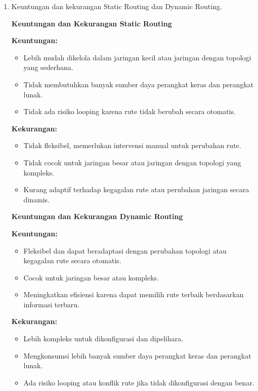 \begin{enumerate}
    \item Keuntungan dan kekurangan Static Routing dan Dynamic Routing.
    
    \textbf{Keuntungan dan Kekurangan Static Routing}

    \textbf{Keuntungan:}
    \begin{itemize}
        \item Lebih mudah dikelola dalam jaringan kecil atau jaringan dengan topologi yang sederhana.
        \item Tidak membutuhkan banyak sumber daya perangkat keras dan perangkat lunak.
        \item Tidak ada risiko looping karena rute tidak berubah secara otomatis.
    \end{itemize}
    
    \textbf{Kekurangan:}
    \begin{itemize}
        \item Tidak fleksibel, memerlukan intervensi manual untuk perubahan rute.
        \item Tidak cocok untuk jaringan besar atau jaringan dengan topologi yang kompleks.
        \item Kurang adaptif terhadap kegagalan rute atau perubahan jaringan secara dinamis.
    \end{itemize}
    
    \textbf{Keuntungan dan Kekurangan Dynamic Routing}
    
    \textbf{Keuntungan:}
    \begin{itemize}
        \item Fleksibel dan dapat beradaptasi dengan perubahan topologi atau kegagalan rute secara otomatis.
        \item Cocok untuk jaringan besar atau kompleks.
        \item Meningkatkan efisiensi karena dapat memilih rute terbaik berdasarkan informasi terbaru.
    \end{itemize}
    
    \textbf{Kekurangan:}
    \begin{itemize}
        \item Lebih kompleks untuk dikonfigurasi dan dipelihara.
        \item Mengkonsumsi lebih banyak sumber daya perangkat keras dan perangkat lunak.
        \item Ada risiko looping atau konflik rute jika tidak dikonfigurasi dengan benar.
    \end{itemize}

\end{enumerate}
